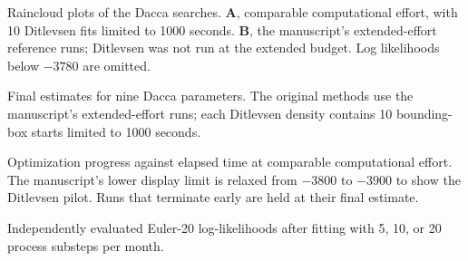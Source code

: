
\caption{Raincloud plots of the Dacca searches. \textbf{A}, comparable
computational effort, with 10 Ditlevsen fits limited to 1000 seconds.
\textbf{B}, the manuscript's extended-effort reference runs; Ditlevsen was
not run at the extended budget. Log likelihoods below $-3780$ are omitted.}

\caption{Final estimates for nine Dacca parameters. The original methods use
the manuscript's extended-effort runs; each Ditlevsen density contains 10
bounding-box starts limited to 1000 seconds.}

\caption{Optimization progress against elapsed time at comparable
computational effort. The manuscript's lower display limit is relaxed from
$-3800$ to $-3900$ to show the Ditlevsen pilot. Runs that terminate early are
held at their final estimate.}

\caption{Independently evaluated Euler-20 log-likelihoods after fitting with
5, 10, or 20 process substeps per month.}
